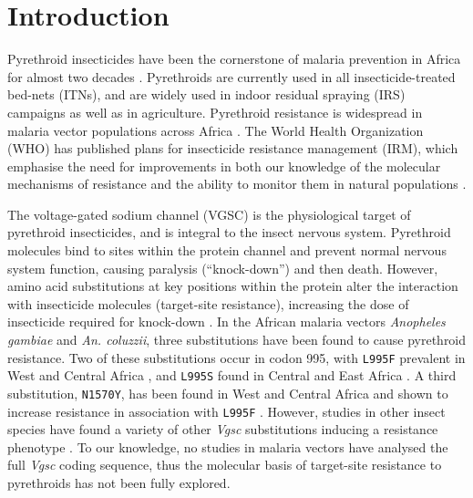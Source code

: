 \documentclass[a4paper,11pt,abstracton,hidelinks]{scrartcl}
\begin{document}
\begin{abstract}
\end{abstract}


\section*{Introduction}


Pyrethroid insecticides have been the cornerstone of malaria prevention in Africa for almost two decades \cite{Bhatt2015}.
%
Pyrethroids are currently used in all insecticide-treated bed-nets (ITNs), and are widely used in indoor residual spraying (IRS) campaigns as well as in agriculture.
%
Pyrethroid resistance is widespread in malaria vector populations across Africa \cite{Hemingway2016}.
%
The World Health Organization (WHO) has published plans for insecticide resistance management (IRM), which emphasise the need for improvements in both our knowledge of the molecular mechanisms of resistance and the ability to monitor them in natural populations \cite{WorldHealthOrganization2012}.


The voltage-gated sodium channel (VGSC) is the physiological target of pyrethroid insecticides, and is integral to the insect nervous system.
%
Pyrethroid molecules bind to sites within the protein channel and prevent normal nervous system function, causing paralysis (``knock-down'') and then death.
%
However, amino acid substitutions at key positions within the protein alter the interaction with insecticide molecules (target-site resistance), increasing the dose of insecticide required for knock-down \cite{Davies2007a,Dong2014}.
%
In the African malaria vectors \textit{Anopheles gambiae} and \textit{An. coluzzii}, three substitutions have been found to cause pyrethroid resistance.
%
Two of these substitutions occur in codon 995\footnotemark, with \texttt{L995F} prevalent in West and Central Africa \cite{Martinez-Torres1998,Silva2014}, and \texttt{L995S} found in Central and East Africa \cite{Ranson2000,Silva2014}.
%
A third substitution, \texttt{N1570Y}, has been found in West and Central Africa and shown to increase resistance in association with \texttt{L995F} \cite{Jones2012}.
%
However, studies in other insect species have found a variety of other \emph{Vgsc} substitutions inducing a resistance phenotype \cite{Davies2007b,Rinkevich2013,Dong2014}.
%
To our knowledge, no studies in malaria vectors have analysed the full \emph{Vgsc} coding sequence, thus the molecular basis of target-site resistance to pyrethroids has not been fully explored.
\end{document}
